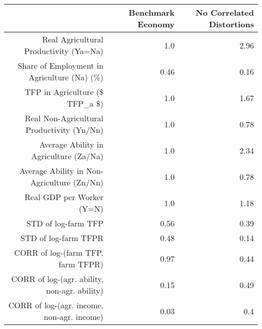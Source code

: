 \begin{tabular}{rrr}
    \hline
     & \textbf{Benchmark Economy} & \textbf{No Correlated Distortions} \\\hline
    Real Agricultural Productivity (Ya=Na) & 1.0 & 2.96 \\
    Share of Employment in Agriculture (Na) (\%) & 0.46 & 0.16 \\
    TFP in Agriculture (\$ TFP\_a \$) & 1.0 & 1.67 \\
    Real Non-Agricultural Productivity (Yn/Nn) & 1.0 & 0.78 \\
    Average Ability in Agriculture (Za/Na) & 1.0 & 2.34 \\
    Average Ability in Non-Agriculture (Zn/Nn) & 1.0 & 0.78 \\
    Real GDP per Worker (Y=N) & 1.0 & 1.18 \\
    STD of log-farm TFP & 0.56 & 0.39 \\
    STD of log-farm TFPR & 0.48 & 0.14 \\
    CORR of log-(farm TFP, farm TFPR) & 0.97 & 0.44 \\
    CORR of log-(agr. ability, non-agr. ability) & 0.15 & 0.49 \\
    CORR of log-(agr. income, non-agr. income) & 0.03 & 0.4 \\\hline
  \end{tabular}
